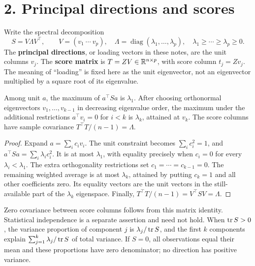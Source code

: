 \section*{2. Principal directions and scores}
Write the spectral decomposition
\[
S=V\Lambda V^\top,\qquad V=(v_1\ \cdots\ v_p),\quad
\Lambda=\operatorname{diag}(\lambda_1,\ldots,\lambda_p),\quad
\lambda_1\geqslant\cdots\geqslant\lambda_p\geqslant0.
\]
The \textbf{principal directions}, or loading vectors in these notes, are
the unit columns $v_j$. The \textbf{score matrix} is
$T=ZV\in\mathbb R^{n\times p}$, with score column $t_j=Zv_j$.
The meaning of ``loading'' is fixed here as the unit eigenvector, not
an eigenvector multiplied by a square root of its eigenvalue.

\begin{theorem}\label{thm:12:successive}
Among unit $a$, the maximum of $a^\top Sa$ is $\lambda_1$.
After choosing orthonormal eigenvectors $v_1,\ldots,v_{k-1}$ in decreasing
eigenvalue order, the maximum under the additional restrictions
$a^\top v_i=0$ for $i<k$ is $\lambda_k$, attained at $v_k$.
The score columns have sample covariance
$T^\top T/(n-1)=\Lambda$.
\end{theorem}
\begin{proof}
Expand $a=\sum_i c_iv_i$. The unit constraint becomes $\sum_i c_i^2=1$,
and $a^\top Sa=\sum_i\lambda_i c_i^2$.
It is at most $\lambda_1$, with equality precisely when $c_i=0$ for
every $\lambda_i<\lambda_1$.
The extra orthogonality restrictions set $c_1=\cdots=c_{k-1}=0$.
The remaining weighted average is at most $\lambda_k$, attained by
putting $c_k=1$ and all other coefficients zero. Its equality vectors
are the unit vectors in the still-available part of the $\lambda_k$
eigenspace. Finally,
$T^\top T/(n-1)=V^\top SV=\Lambda$.
\end{proof}

Zero covariance between score columns follows from this matrix identity.
Statistical independence is a separate assertion and need not hold.
When $\operatorname{tr} S>0$, the variance proportion of component $j$ is
$\lambda_j/\operatorname{tr} S$, and the first $k$ components explain
$\sum_{j=1}^k\lambda_j/\operatorname{tr} S$ of total variance.
If $S=0$, all observations equal their mean and these proportions have
zero denominator; no direction has positive variance.


